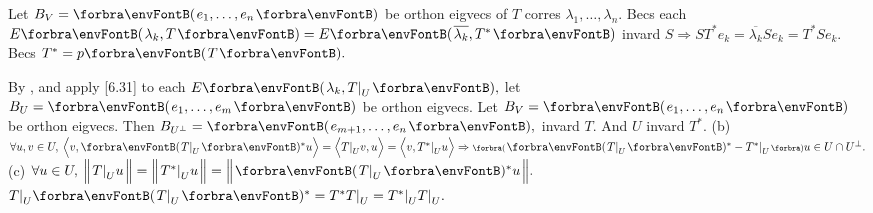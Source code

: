 Let $B_V=\Par{e_1,\dots,e_n}$ be orthon eigvecs of $T$ corres $\lambda_1,\dots,\lambda_n.$\parSol{}
Becs each $E\Par{\lambda_k,T}=E\Par{\overline{\lambda_k},T^*}$ invard $S\Rightarrow ST^*e_k=\overline{\lambda_k}Se_k=T^*Se_k.$ \;\Or Becs $T^*=p\Par{T}.$\PfEnd
\SepLine

By , and apply [6.31] to each $E\Par{\lambda_k,T\mmid_U},$ let $B_U=\Par{e_1,\dots,e_m}$ be orthon eigvecs.\parSol{}
Let $B_V=\Par{e_1,\dots,e_n}$ be orthon eigvecs. Then $B_{U^\perp}=\Par{e_{m+1},\dots,e_n},$ invard $T.$ And $U$ invard $T^*.$\vspace{2pt}\parSol{}
(b) $\forall u,v\in U,\:\BigAng{v,\Par{T\mmid_U}{^*}u}=\BigAng{T\mmid_U v,u}=\BigAng{v,T^*\mmid_U u}\Rightarrow\BigPar{\Par{T\mmid_U}{^*}-T^*\mmid_U}u\in U\cap U^\perp.$\vspace{2pt}\parSol{}
(c) $\forall u\in U,\:\BigDvert{T\mmid_U u}=\BigDvert{T^*\mmid_U u}=\BigDvert{\Par{T\mmid_U}{^*}u}.$ \;\Or $T\mmid_U\Par{T\mmid_U}{^*}=T^*T\mmid_U=T^*\mmid_UT\mmid_U.$\PfEnd\vspace{3pt}
